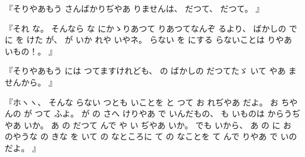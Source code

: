 %
『そりやあもう
さんばかりぢやあ
りませんは、
%
だつて、
%
だつて。
』

%
『それ
な。
%
そんなら
な
にかゝりあつて
りあつてなんぞ
るより、
%
ばかしの
で%
に
を
けた
が、
%
が
いか
れや
いやネ。
%
らない
を
にする
らないことは
りやあ
いもの！。
』

%
『そりやあもう
には
つてますけれども、
%
の
ばかしの
だつてたゞ
いて
やあ
ませんから。
』

%
『ホヽヽ、
%
そんな
らない
つとも
いことを
と
つて
お
れぢやあ
だよ。
%
お
ちやんの
が
つて
ふよ。
%
が
の
さへ
けりやあ
で
いんだもの、
%
も
いものは
からうぢやあ
いか。
%
あ
の
だつて
んで
や
い
ぢやあ
いか。
%
でも
いから、
%
あ
の
に
お
のやうな
の
きな
を
いて
の
なところに
て
の
なことを
て
んで
りやあ
で
いのだよ。
』
